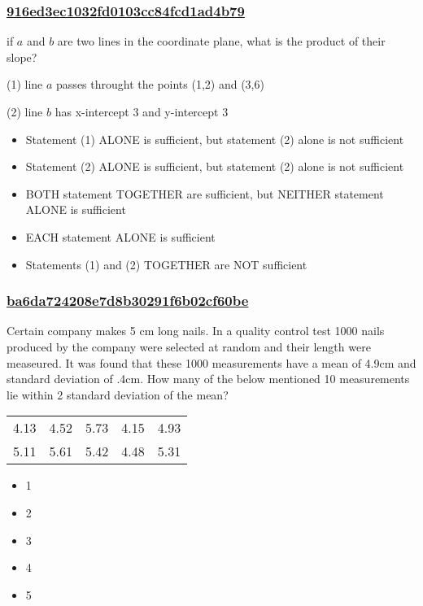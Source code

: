 \documentclass[]{beamer}
\begin{document}
\begin{frame}
    \frametitle{\underline{916ed3ec1032fd0103cc84fcd1ad4b79}}
    if $a$ and $b$ are two lines in the coordinate plane, what is the product of their slope?\par
(1) line $a$ passes throught the points (1,2) and (3,6)\par
(2) line $b$ has x-intercept 3 and y-intercept 3    
    \begin{itemize}
        \item
            Statement (1) ALONE is sufficient, but statement (2) alone is not sufficient
        \item
            Statement (2) ALONE is sufficient, but statement (2) alone is not sufficient
        \item
            BOTH statement TOGETHER are sufficient, but NEITHER statement ALONE is sufficient
        \item
            EACH statement ALONE is sufficient
        \item
            Statements (1) and (2) TOGETHER are NOT sufficient
    \end{itemize}
\end{frame}

\begin{frame}
    \frametitle{\underline{ba6da724208e7d8b30291f6b02cf60be}}
    Certain company makes 5 cm long nails. In a quality control test 1000 nails produced by the company were selected at random and their length were measeured. It was found that these 1000 measurements have a mean of 4.9cm and standard deviation of .4cm. How many of the below mentioned 10 measurements lie within 2 standard deviation of the mean?\par
   \begin{tabular}{c c c c c}
4.13 & 4.52 & 5.73 & 4.15 & 4.93\\
5.11 & 5.61 & 5.42 & 4.48 & 5.31
\end{tabular} 
    \begin{itemize}
        \item
            1
        \item
            2
        \item
            3
        \item
            4
        \item
            5
    \end{itemize}
\end{frame}
\end{document}

